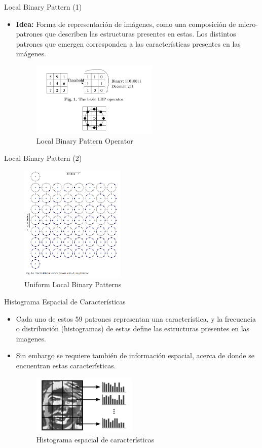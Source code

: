 \documentclass{beamer}
\begin{document}
\begin{frame}{Local Binary Pattern (1)}
\begin{itemize}
	\item \textbf{Idea:} Forma de representación de imágenes, como una composición de micro-patrones que describen
	las estructuras presentes en estas. Los distintos patrones que emergen corresponden a las características presentes
	en las imágenes.
\begin{figure}[htpb!]
\centering
\includegraphics[width=6cm]{lbp}
\caption{Local Binary Pattern Operator}
\end{figure}
\end{itemize}
\end{frame}

\begin{frame}{Local Binary Pattern (2)}
\begin{figure}[htpb!]
\centering
\includegraphics[width=5cm]{uniform_lbp}
\caption{Uniform Local Binary Patterns}
\end{figure}
\end{frame}



\begin{frame}{Histograma Espacial de Características}
\begin{itemize}
	\item Cada uno de estos 59 patrones representan una característica, y la frecuencia o distribución (histogramas) de estas define las estructuras presentes en las imagenes.
	\item Sin embargo se requiere también de información espacial, acerca de donde se encuentran estas características.
\begin{figure}[htpb!]
\centering
\includegraphics[width=5cm]{spatial_hist}
\caption{Histograma espacial de características}
\end{figure}
\end{itemize}
\end{frame}
\end{document}
